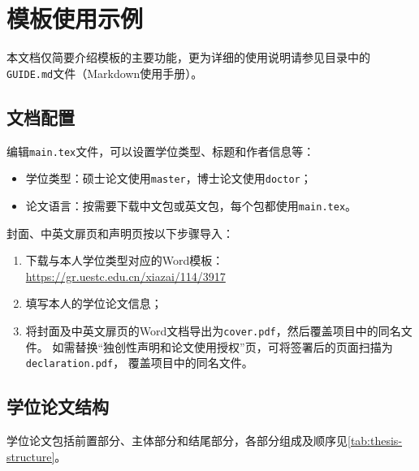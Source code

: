 \chapter{模板使用示例}

本文档仅简要介绍模板的主要功能，更为详细的使用说明请参见目录中的
\mbox{\texttt{GUIDE.md}}文件（Markdown使用手册）。

\section{文档配置}

编辑\texttt{main.tex}文件，可以设置学位类型、标题和作者信息等：

\begin{itemize}
    \item 学位类型：硕士论文使用\texttt{master}，博士论文使用\texttt{doctor}；
    \item 论文语言：按需要下载中文包或英文包，每个包都使用\texttt{main.tex}。
\end{itemize}

封面、中英文扉页和声明页按以下步骤导入：

\begin{enumerate}
    \item 下载与本人学位类型对应的Word模板：\href{https://gr.uestc.edu.cn/xiazai/114/3917}{https://gr.uestc.edu.cn/xiazai/114/3917}
    \item 填写本人的学位论文信息；
    \item 将封面及中英文扉页的Word文档导出为\texttt{cover.pdf}，然后覆盖项目中的同名文件。
        如需替换“独创性声明和论文使用授权”页，可将签署后的页面扫描为\texttt{declaration.pdf}，
        覆盖项目中的同名文件。
\end{enumerate}

\section{学位论文结构}

学位论文包括前置部分、主体部分和结尾部分，各部分组成及顺序见\autoref{tab:thesis-structure}。

